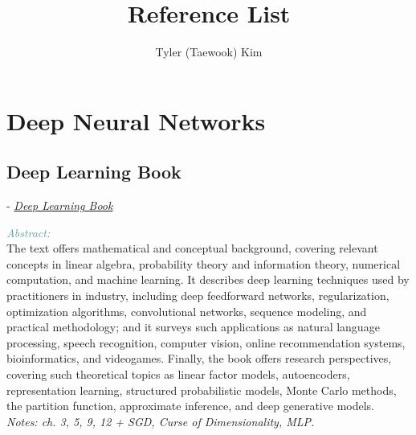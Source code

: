 \documentclass[]{article}
\title{Reference List}
\author{Tyler (Taewook) Kim}
\newcommand{\paperentry}[4]{
            \hangindent=1cm
            \cite{#1} - \href{run:../References/#3}{\textcolor{Sepia}{\textit{#2}}}
            
            \noindent            
            \begin{minipage}[t]{0.1\linewidth}\hfill\end{minipage}
            \begin{minipage}[t]{0.8\linewidth}\textcolor{CadetBlue}{{\textit{Abstract:}}}\\#4\end{minipage}
            \vspace{.25cm}
          }
\begin{document}
\maketitle

\tableofcontents

\newpage

\section{Deep Neural Networks}
\subsection{Deep Learning Book}
          \paperentry{Goodfellow2016dlbook}
          {Deep Learning Book}
          {Deep Neural Networks/Deep CNN.pdf}
          {The text offers mathematical and conceptual background, covering relevant concepts in linear algebra, probability theory and information theory, numerical computation, and machine learning. It describes deep learning techniques used by practitioners in industry, including deep feedforward networks, regularization, optimization algorithms, convolutional networks, sequence modeling, and practical methodology; and it surveys such applications as natural language processing, speech recognition, computer vision, online recommendation systems, bioinformatics, and videogames. Finally, the book offers research perspectives, covering such theoretical topics as linear factor models, autoencoders, representation learning, structured probabilistic models, Monte Carlo methods, the partition function, approximate inference, and deep generative models.
          \\\emph{Notes: ch. 3, 5, 9, 12 + SGD, Curse of Dimensionality, MLP.}} \\
      
\end{document}
